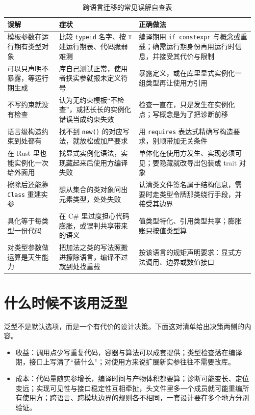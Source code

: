 \documentclass[12pt,a4paper,fontset=fandol]{ctexbook}
\newcommand{\kw}[1]{\texttt{#1}}
\begin{document}
\begin{table}[htbp]
\centering
\caption{跨语言迁移的常见误解自查表}
\begin{tabularx}{0.83\textwidth}{>{\raggedright\arraybackslash}p{} >{\raggedright\arraybackslash}p{} >{\raggedright\arraybackslash}X}
\toprule
误解 & 症状 & 正确做法\\
\midrule
\strut 模板参数在运行期有类型对象 & 比较 \kw{typeid} 名字、按 \kw{T} 建运行期表、代码脆弱难测 & 编译期用 \kw{if constexpr} 与概念或重载；确需运行期身份再用运行时信息，并接受其代价与限制\\
\strut 可以只声明不暴露，等运行期生成 & 库自己测试正常，使用者换实参就报未定义符号 & 暴露定义，或在库里显式实例化一组类型再让使用方引用\\
\strut 不写约束就没有检查 & 认为无约束模板“不检查”，或把长长的实例化错误当成约束失效 & 检查一直在，只是发生在实例化点；写概念是为了把诊断前移\\
\strut 语言级构造约束到处都有 & 找不到 \kw{new()}\allowbreak{} 的对应写法，就放松或加严要求 & 用 \kw{requires} 表达式精确写构造要求，别顺带加无关条件\\
\strut 在 Rust 里也能实例化一次给外面用 & 找显式实例化语法，实现藏起来后使用方编译失败 & 单体化在使用方发生、实现必须可见；要隐藏就改导出包装或 trait 对象\\
\strut 擦除后还能靠 \kw{Class} 重建实参 & 想从集合的类对象问出元素类型，处处失败 & 认清类文件签名属于结构信息，需要时走类型令牌那类绕行手段，并接受其边界\\
\strut 具化等于每类型一份代码 & 在 C\# 里过度担心代码膨胀，或误判共享带来的语义 & 值类型特化、引用类型共享；膨胀账只按值类型算\\
\strut 对类型参数做运算是天生能力 & 把加法之类的写法照搬进擦除语言，编译不过就到处找重载 & 按该语言的规矩声明要求：显式方法调用、边界或数值接口\\
\bottomrule
\end{tabularx}
\end{table}

\section{什么时候不该用泛型}

泛型不是默认选项，而是一个有代价的设计决策。下面这对清单给出决策两侧的内容。

\begin{compare}[title={泛型收益与泛型成本}]
\begin{itemize}
\item 收益：调用点少写重复代码，容器与算法可以成套提供；类型检查落在编译期，接口上写清了“装什么”；对使用方来说扩展新实参往往不需要改库。
\item 成本：代码量随实参增长，编译时间与产物体积都要算；诊断可能变长、定位变远；实现可见性与接口稳定性互相牵扯，头文件里多一个成员就可能重编所有使用方；跨语言、跨模块边界的规则各不相同，一套设计要在多个地方分别验证。
\end{itemize}
\end{compare}
\end{document}
